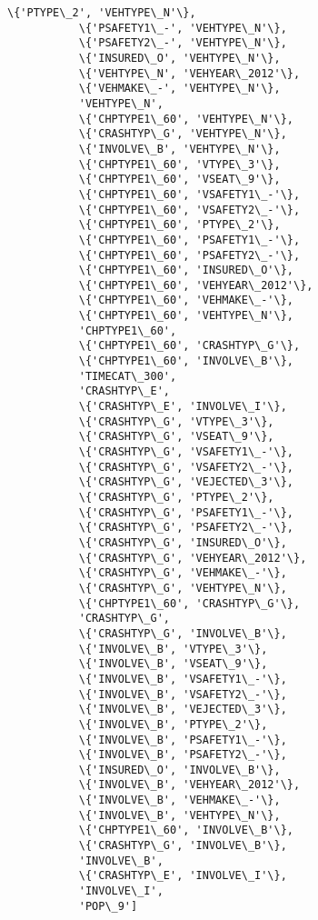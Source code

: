 \documentclass[11pt]{article}
\begin{document}
\begin{Verbatim}[commandchars=\\\{\}]
           \{'PTYPE\_2', 'VEHTYPE\_N'\},
           \{'PSAFETY1\_-', 'VEHTYPE\_N'\},
           \{'PSAFETY2\_-', 'VEHTYPE\_N'\},
           \{'INSURED\_O', 'VEHTYPE\_N'\},
           \{'VEHTYPE\_N', 'VEHYEAR\_2012'\},
           \{'VEHMAKE\_-', 'VEHTYPE\_N'\},
           'VEHTYPE\_N',
           \{'CHPTYPE1\_60', 'VEHTYPE\_N'\},
           \{'CRASHTYP\_G', 'VEHTYPE\_N'\},
           \{'INVOLVE\_B', 'VEHTYPE\_N'\},
           \{'CHPTYPE1\_60', 'VTYPE\_3'\},
           \{'CHPTYPE1\_60', 'VSEAT\_9'\},
           \{'CHPTYPE1\_60', 'VSAFETY1\_-'\},
           \{'CHPTYPE1\_60', 'VSAFETY2\_-'\},
           \{'CHPTYPE1\_60', 'PTYPE\_2'\},
           \{'CHPTYPE1\_60', 'PSAFETY1\_-'\},
           \{'CHPTYPE1\_60', 'PSAFETY2\_-'\},
           \{'CHPTYPE1\_60', 'INSURED\_O'\},
           \{'CHPTYPE1\_60', 'VEHYEAR\_2012'\},
           \{'CHPTYPE1\_60', 'VEHMAKE\_-'\},
           \{'CHPTYPE1\_60', 'VEHTYPE\_N'\},
           'CHPTYPE1\_60',
           \{'CHPTYPE1\_60', 'CRASHTYP\_G'\},
           \{'CHPTYPE1\_60', 'INVOLVE\_B'\},
           'TIMECAT\_300',
           'CRASHTYP\_E',
           \{'CRASHTYP\_E', 'INVOLVE\_I'\},
           \{'CRASHTYP\_G', 'VTYPE\_3'\},
           \{'CRASHTYP\_G', 'VSEAT\_9'\},
           \{'CRASHTYP\_G', 'VSAFETY1\_-'\},
           \{'CRASHTYP\_G', 'VSAFETY2\_-'\},
           \{'CRASHTYP\_G', 'VEJECTED\_3'\},
           \{'CRASHTYP\_G', 'PTYPE\_2'\},
           \{'CRASHTYP\_G', 'PSAFETY1\_-'\},
           \{'CRASHTYP\_G', 'PSAFETY2\_-'\},
           \{'CRASHTYP\_G', 'INSURED\_O'\},
           \{'CRASHTYP\_G', 'VEHYEAR\_2012'\},
           \{'CRASHTYP\_G', 'VEHMAKE\_-'\},
           \{'CRASHTYP\_G', 'VEHTYPE\_N'\},
           \{'CHPTYPE1\_60', 'CRASHTYP\_G'\},
           'CRASHTYP\_G',
           \{'CRASHTYP\_G', 'INVOLVE\_B'\},
           \{'INVOLVE\_B', 'VTYPE\_3'\},
           \{'INVOLVE\_B', 'VSEAT\_9'\},
           \{'INVOLVE\_B', 'VSAFETY1\_-'\},
           \{'INVOLVE\_B', 'VSAFETY2\_-'\},
           \{'INVOLVE\_B', 'VEJECTED\_3'\},
           \{'INVOLVE\_B', 'PTYPE\_2'\},
           \{'INVOLVE\_B', 'PSAFETY1\_-'\},
           \{'INVOLVE\_B', 'PSAFETY2\_-'\},
           \{'INSURED\_O', 'INVOLVE\_B'\},
           \{'INVOLVE\_B', 'VEHYEAR\_2012'\},
           \{'INVOLVE\_B', 'VEHMAKE\_-'\},
           \{'INVOLVE\_B', 'VEHTYPE\_N'\},
           \{'CHPTYPE1\_60', 'INVOLVE\_B'\},
           \{'CRASHTYP\_G', 'INVOLVE\_B'\},
           'INVOLVE\_B',
           \{'CRASHTYP\_E', 'INVOLVE\_I'\},
           'INVOLVE\_I',
           'POP\_9']
\end{Verbatim}
            
\end{document}

